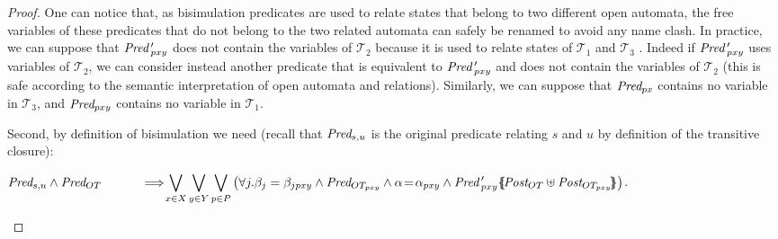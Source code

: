 \documentclass{lmcs}
\begin{document}
\begin{proof}
One can notice that, as bisimulation predicates are used to relate states that 
belong to two different open automata, the free variables of these predicates 
that do not belong to the two related automata can safely be renamed to avoid any 
name clash. In practice,
we can suppose that $\Pred\,'_{{pxy}}$ does not 
contain the variables of $\mathcal{T}_2$ because it is used to relate states of $\mathcal{T}_1$ and $\mathcal{T}_3$ . Indeed if $\Pred\,'_{{pxy}}$ uses variables of 	$\mathcal{T}_2$, we can consider instead another predicate that is equivalent to $\Pred\,'_{{pxy}}$ and does not 
contain the variables of 	$\mathcal{T}_2$ (this is safe according to the semantic interpretation of open automata and relations). 
Similarly, we can suppose that $\Pred_{{px}}$ contains no 
variable in $\mathcal{T}_3$, and $\Pred_{{pxy}}$ contains no 
variable in $\mathcal{T}_1$.
       	
       	Second, by definition of bisimulation we need (recall that $\Pred_{s,u}$ is the 
       	original predicate relating $s$ and $u$ by definition of the transitive 
       	closure):\\
       	\begin{small}
       		$\Pred_{s,u} \land \Pred_{OT}\\
       		\hspace{1cm} \implies\!\!\! \displaystyle{\bigvee_{x\in X}\bigvee_{y\in Y}\bigvee_{p\in P}
       		\left( \forall j. \beta_j=\beta_{jpxy}  \land \Pred_{OT_{pxy}}
       		\land \alpha\!=\!\alpha_{pxy} \land
       		\Pred\,'_{{pxy}}\subst{\Post_{OT}\uplus\Post_{OT_{pxy}}}\right)}$.
       	\end{small}


\end{proof}
\end{document}
